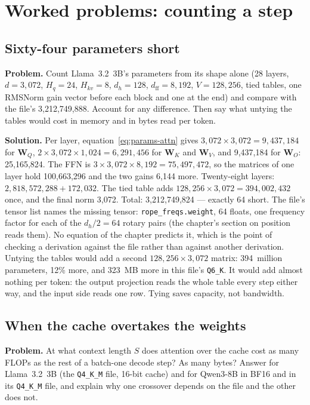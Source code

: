 \section{Worked problems: counting a step}

\subsection{Sixty-four parameters short}
\textbf{Problem.} Count Llama~3.2~3B's parameters from its shape alone
(28 layers, $d = 3{,}072$, $H_q = 24$, $H_{kv} = 8$, $d_h = 128$,
$d_{\mathrm{ff}} = 8{,}192$, $V = 128{,}256$, tied tables, one RMSNorm gain
vector before each block and one at the end) and compare with the file's
3,212,749,888. Account for any difference. Then say what untying the tables
would cost in memory and in bytes read per token.

\textbf{Solution.} Per layer, equation~\eqref{eq:params-attn} gives
$3{,}072 \times 3{,}072 = 9{,}437{,}184$ for $\mathbf{W}_Q$,
$2 \times 3{,}072 \times 1{,}024 = 6{,}291{,}456$ for $\mathbf{W}_K$ and
$\mathbf{W}_V$, and 9,437,184 for $\mathbf{W}_O$: 25,165,824. The FFN is
$3 \times 3{,}072 \times 8{,}192 = 75{,}497{,}472$, so the matrices of one layer
hold 100,663,296 and the two gains 6,144 more. Twenty-eight layers:
$2{,}818{,}572{,}288 + 172{,}032$. The tied table adds
$128{,}256 \times 3{,}072 = 394{,}002{,}432$ once, and the final norm 3,072.
Total: 3,212,749,824 --- exactly 64 short. The file's tensor list names the
missing tensor: \texttt{rope\_freqs.weight}, 64 floats, one frequency factor for
each of the $d_h/2 = 64$ rotary pairs (the chapter's section on position reads
them). No equation of the chapter predicts it, which is the point of checking a
derivation against the file rather than against another derivation.
Untying the tables would add a second $128{,}256 \times 3{,}072$ matrix:
394~million parameters, 12\% more, and 323~MB more in this file's
\texttt{Q6\_K}. It would add almost nothing per token: the output projection
reads the whole table every step either way, and the input side reads one row.
Tying saves capacity, not bandwidth.

\subsection{When the cache overtakes the weights}
\textbf{Problem.} At what context length $S$ does attention over the cache
cost as many FLOPs as the rest of a batch-one decode step? As many bytes? Answer
for Llama~3.2~3B (the \texttt{Q4\_K\_M} file, 16-bit cache) and for Qwen3-8B in
BF16 and in its \texttt{Q4\_K\_M} file, and explain why one crossover depends on
the file and the other does not.

